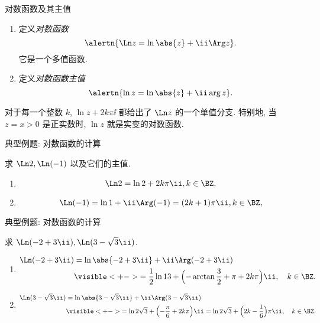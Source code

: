 \begin{frame}{对数函数及其主值}
	\onslide<+->
	\begin{definition}
		\begin{enumerate}
			\item 定义\emph{对数函数}
			\[
				\alertn{\Ln z=\ln\abs{z}+\ii\Arg z}.
			\]
			它是一个多值函数.
			\item 定义\emph{对数函数主值}
			\[
				\alertn{\ln z=\ln\abs{z}+\ii\arg z}.
			\]
			\bigdel
		\end{enumerate}
	\end{definition}

	\onslide<+->
	对于每一个整数 $k$, $\ln z+2k\pi\ii$ 都给出了 $\Ln z$ 的一个单值分支.
	\onslide<+->
	特别地, 当 $z=x>0$ 是正实数时, $\ln z$ 就是实变的对数函数.
\end{frame}


\begin{frame}{典型例题: 对数函数的计算}
	\onslide<+->
	\begin{example}[nearnext]
		求 $\Ln 2,\Ln(-1)$ 以及它们的主值.
	\end{example}
	\onslide<+->
	\begin{solution}[nearprev]
		\begin{enumerate}
			\item
			\[
				\Ln2=\ln2+2k\pi\ii, k\in\BZ,
			\]
			\onslide<+->{%
				主值为 $\ln 2$.
			}
			\item
			\[
				\Ln(-1)=\ln1+\ii\Arg(-1)=(2k+1)\pi\ii, k\in\BZ,
			\]
			\onslide<+->{%
				主值为 $\pi\ii$.
			}
		\end{enumerate}
	\end{solution}
\end{frame}


\begin{frame}{典型例题: 对数函数的计算}
	\beqskip{5pt}
	\onslide<+->
	\begin{example}[nearnext]
	求 $\Ln(-2+3\ii),\Ln(3-\sqrt3 \ii)$.
	\end{example}
	\onslide<+->
	\begin{solution}[nearprev]
		\begin{enumerate}
			\item
			\begin{align*}
				\Ln(-2+3\ii)&=\ln\abs{-2+3\ii}+\ii\Arg(-2+3\ii)\\
				&\visible<+->{=\frac 12\ln 13+\Bigl(-\arctan\frac 32+\pi+2k\pi\Bigr)\ii,\quad k\in\BZ.}
			\end{align*}
			\item
			\begin{align*}
				\Ln(3-\sqrt3\ii)&=\ln\abs{3-\sqrt 3\ii}+\ii\Arg(3-\sqrt 3\ii)\\
				&\visible<+->{=\ln 2\sqrt 3+\Bigl(-\frac\pi6+2k\pi\Bigr)\ii
				=\ln 2\sqrt 3+\Bigl(2k-\frac16\Bigr)\pi\ii,\quad k\in\BZ.}
			\end{align*}
		\end{enumerate}
		\bigdel
	\end{solution}
	\endgroup
\end{frame}


